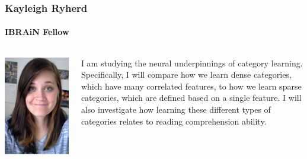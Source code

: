 \documentclass[aspectratio=169]{beamer}
\begin{document}
\begin{frame}
	\frametitle{Kayleigh Ryherd}
	\framesubtitle{IBRAiN Fellow}

	\begin{columns}[T]
		\begin{column}{.25\textwidth}
			\includegraphics[width=\textwidth]{img/ryherd.jpg}
		\end{column}

		\begin{column}{.75\textwidth}
			I am studying the neural underpinnings of category learning. Specifically, I will compare how we learn dense categories, which have many correlated features, to how we learn sparse categories, which are defined based on a single feature. I will also investigate how learning these different types of categories relates to reading comprehension ability.
		\end{column}
	\end{columns}
\end{frame}
\end{document}
